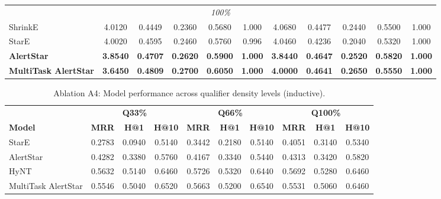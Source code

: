 \documentclass[10pt,journal,compsoc]{IEEEtran}
\begin{document}
\begin{table}[t]
\begin{tabular}{l ccccc ccccc}
\multicolumn{11}{c}{\textit{100\%}} \\
\cmidrule{1-11}
ShrinkE         & 4.0120 & 0.4449 & 0.2360 & 0.5680 & 1.000 & 4.0680 & 0.4477 & 0.2440 & 0.5500 & 1.000 \\
StarE           & 4.0020 & 0.4595 & 0.2460 & 0.5760 & 0.996 & 4.0460 & 0.4236 & 0.2040 & 0.5320 & 1.000 \\
\textbf{AlertStar}       & \textbf{3.8540} & \textbf{0.4707} & \textbf{0.2620} & \textbf{0.5900} & \textbf{1.000} & \textbf{3.8440} & \textbf{0.4647} & \textbf{0.2520} & \textbf{0.5820} & \textbf{1.000} \\
\textbf{MultiTask AlertStar} & \textbf{3.6450} & \textbf{0.4809} & \textbf{0.2700} & \textbf{0.6050} & \textbf{1.000} & \textbf{4.0000} & \textbf{0.4641} & \textbf{0.2650} & \textbf{0.5550} & \textbf{1.000} \\
\bottomrule
\end{tabular}
\end{table}





\begin{table}[t]
\centering
\tiny
\caption{Ablation A4: Model performance across qualifier density levels (inductive).}
\label{tab:ablation_density}
\begin{tabular}{l|ccc|ccc|ccc}
\toprule
 & \multicolumn{3}{c|}{\textbf{Q33\%}} 
 & \multicolumn{3}{c|}{\textbf{Q66\%}} 
 & \multicolumn{3}{c}{\textbf{Q100\%}} \\
\textbf{Model} 
 & \textbf{MRR} & \textbf{H@1} & \textbf{H@10}
 & \textbf{MRR} & \textbf{H@1} & \textbf{H@10}
 & \textbf{MRR} & \textbf{H@1} & \textbf{H@10} \\
\midrule
StarE               & 0.2783 & 0.0940 & 0.5140 
                    & 0.3442 & 0.2180 & 0.5140 
                    & 0.4051 & 0.3140 & 0.5340 \\
AlertStar           & 0.4282 & 0.3380 & 0.5760 
                    & 0.4167 & 0.3340 & 0.5440 
                    & 0.4313 & 0.3420 & 0.5820 \\
HyNT                & 0.5632 & 0.5140 & 0.6460 
                    & 0.5726 & 0.5320 & 0.6440 
                    & 0.5692 & 0.5280 & 0.6460 \\
MultiTask AlertStar & 0.5546 & 0.5040 & 0.6520 
                    & 0.5663 & 0.5200 & 0.6540 
                    & 0.5531 & 0.5060 & 0.6460 \\
\bottomrule
\end{tabular}
\end{table}
\end{document}

